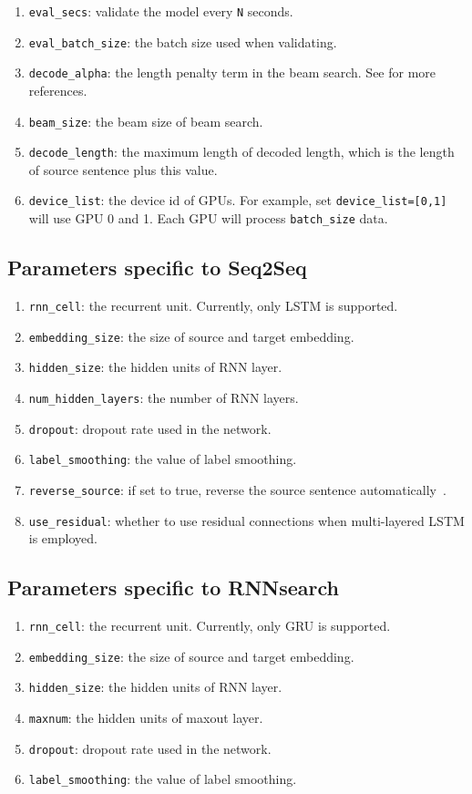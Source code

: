 \documentclass{article}
\begin{document}
\begin{enumerate}
\item \verb|eval_secs|: validate the model every \verb|N| seconds.
\item \verb|eval_batch_size|: the batch size used when validating.
\item \verb|decode_alpha|: the length penalty term in the beam search. See \citep{Wu:16} for more references.
\item \verb|beam_size|: the beam size of beam search.
\item \verb|decode_length|: the maximum length of decoded length, which is the length of source sentence plus this value.
\item \verb|device_list|: the device id of GPUs. For example, set \verb|device_list=[0,1]| will use GPU 0 and 1. Each GPU will process \verb|batch_size| data.
\end{enumerate}

\subsection{Parameters specific to Seq2Seq}
\begin{enumerate}
\item \verb|rnn_cell|: the recurrent unit. Currently, only LSTM is supported.
\item \verb|embedding_size|: the size of source and target embedding.
\item \verb|hidden_size|: the hidden units of RNN layer.
\item \verb|num_hidden_layers|: the number of RNN layers.
\item \verb|dropout|: dropout rate used in the network.
\item \verb|label_smoothing|: the value of label smoothing.
\item \verb|reverse_source|: if set to true, reverse the source sentence automatically~\citep{Sutskever:14}.
\item \verb|use_residual|: whether to use residual connections when multi-layered LSTM is employed.
\end{enumerate}
\subsection{Parameters specific to RNNsearch}
\begin{enumerate}
\item \verb|rnn_cell|: the recurrent unit. Currently, only GRU is supported.
\item \verb|embedding_size|: the size of source and target embedding.
\item \verb|hidden_size|: the hidden units of RNN layer.
\item \verb|maxnum|: the hidden units of maxout layer.
\item \verb|dropout|: dropout rate used in the network.
\item \verb|label_smoothing|: the value of label smoothing.
\end{enumerate}
\end{document}

